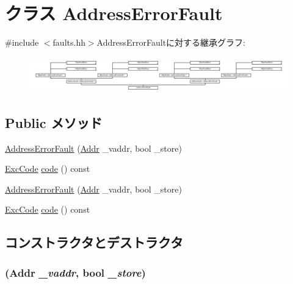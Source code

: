 \hypertarget{classMipsISA_1_1AddressErrorFault}{
\section{クラス AddressErrorFault}
\label{classMipsISA_1_1AddressErrorFault}
}


{\ttfamily \#include $<$faults.hh$>$}AddressErrorFaultに対する継承グラフ:\begin{figure}[H]
\begin{center}
\leavevmode
\includegraphics[height=1.5625cm]{classMipsISA_1_1AddressErrorFault}
\end{center}
\end{figure}
\subsection*{Public メソッド}
\begin{DoxyCompactItemize}
\item 
\hyperlink{classMipsISA_1_1AddressErrorFault_a63571998d6c69ae9fc079f7bded37b9d}{AddressErrorFault} (\hyperlink{classm5_1_1params_1_1Addr}{Addr} \_\-vaddr, bool \_\-store)
\item 
\hyperlink{namespaceMipsISA_abcc8a7c57cd8becefbfd621dbff5ffd4}{ExcCode} \hyperlink{classMipsISA_1_1AddressErrorFault_a1dd20a2460d7723d3eaa287b7cc07e79}{code} () const 
\item 
\hyperlink{classMipsISA_1_1AddressErrorFault_a63571998d6c69ae9fc079f7bded37b9d}{AddressErrorFault} (\hyperlink{classm5_1_1params_1_1Addr}{Addr} \_\-vaddr, bool \_\-store)
\item 
\hyperlink{namespaceMipsISA_abcc8a7c57cd8becefbfd621dbff5ffd4}{ExcCode} \hyperlink{classMipsISA_1_1AddressErrorFault_a1dd20a2460d7723d3eaa287b7cc07e79}{code} () const 
\end{DoxyCompactItemize}


\subsection{コンストラクタとデストラクタ}
\hypertarget{classMipsISA_1_1AddressErrorFault_a63571998d6c69ae9fc079f7bded37b9d}{
\subsubsection[{AddressErrorFault}]{ ({\bf Addr} {\em \_\-vaddr}, \/  bool {\em \_\-store})}}
\label{classMipsISA_1_1AddressErrorFault_a63571998d6c69ae9fc079f7bded37b9d}



